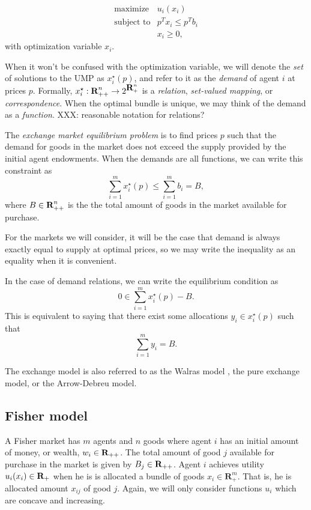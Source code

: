 \documentclass[12pt]{article}
\begin{document}
\begin{equation}
\label{p-ump}
\begin{array}{ll}
\mbox{maximize} & u_i(x_i) \\
\mbox{subject to} & p^T x_i \leq p^T b_i \\
& x_i \geq 0,
\end{array}
\end{equation}
with optimization variable $x_i$.

When it won't be confused with the optimization variable,
we will denote the \emph{set} of solutions to the UMP as $x^\star_i(p)$,
and refer to it as the \emph{demand} of agent $i$ at prices $p$.
Formally, $x_i^\star : {\mbox{\bf R}}^n_{++} \to 2^{{\mbox{\bf R}}^n_+}$ is a
\emph{relation}, \emph{set-valued mapping}, or \emph{correspondence}.
When the optimal bundle is unique, we may think of
the demand as a \emph{function}.
XXX: reasonable notation for relations?

The \emph{exchange market equilibrium problem} is to find prices $p$
such that the demand for goods in the market does not exceed the supply
provided by the initial agent endowments.
When the demands are all functions, we can write this constraint as
\[
\sum_{i=1}^m x^\star_{i}(p) \leq \sum_{i=1}^m b_i = B,
\]
where $B \in {\mbox{\bf R}}^n_{++}$ is the
the total amount of goods in the market available for purchase.

For the markets we will consider, it will be the case that demand is
always exactly equal to supply at optimal prices,
so we may write the inequality as an equality when it is convenient. 

In the case of demand relations, we can write the equilibrium
condition as
\[
0 \in \sum_{i=1}^m x^\star_{i}(p) - B.
\]
This is equivalent to saying that there exist some
allocations $y_i \in x^\star_i(p)$ such that
\[
\sum_{i=1}^m y_i = B.
\]

The exchange model is also referred to as the Walras model \cite{walras1896elements},
the pure exchange model, or the Arrow-Debreu model.

\subsection{Fisher model}
A Fisher market has $m$ agents and $n$ goods where
agent $i$ has an initial amount of money, or wealth, $w_i \in {\mbox{\bf R}}_{++}$.
The total amount of good $j$ available for purchase in the market is given by
$B_j \in {\mbox{\bf R}}_{++}$.
Agent $i$ achieves utility $u_i(x_i) \in {\mbox{\bf R}}_+$ when he is is allocated a
bundle of goods $x_i \in \mathbf{R}^m_{+}$. That is, he is allocated amount
$x_{ij}$ of good $j$.
Again, we will only consider functions $u_i$ which are concave and increasing.
\end{document}
